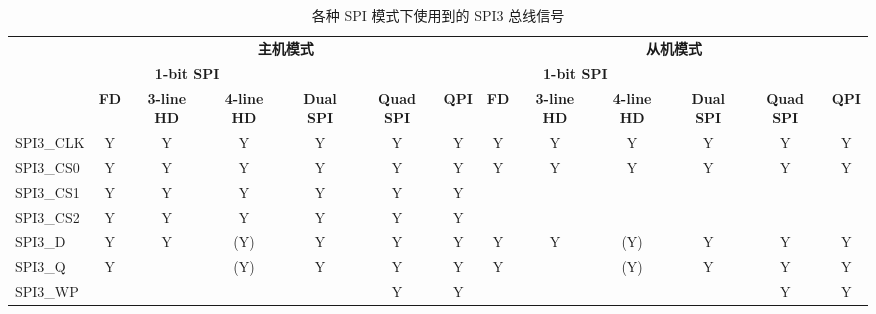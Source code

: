 \documentclass[main\_\_CN.tex]{subfiles}
\begin{document}
\begin{landscape}
\begin{table}[H]
    \centering
    \caption{各种 SPI 模式下使用到的 SPI3 总线信号}
    \label{tab:spi3-bus-singals-used-in-various-spi-modes}

    \begin{threeparttable}
    \begin{tabular}{ |p{2.0cm} |c|c|c|c|c|c|c|c|c|c|c|c| }
    \hline
        \rowcolor{lightgray}
        & \multicolumn{6}{c|}{\textbf{主机模式}} & \multicolumn{6}{c|}{\textbf{从机模式}} \\\cline{2-13}
        \rowcolor{lightgray}
        & \multicolumn{3}{c|}{\textbf{1-bit SPI}} & & & & \multicolumn{3}{c|}{\textbf{1-bit SPI}} & & & \\ \cline{2-4} \cline{8-10}
        \rowcolor{lightgray}
        \multirow{-3}{*}{\textbf{SPI3 总线信号}} & \textbf{FD\tnote{1}} & \textbf{3-line HD\tnote{2}} & \textbf{4-line HD} & \multirow{-2}{*}{\textbf{Dual SPI}} & \multirow{-2}{*}{\textbf{Quad SPI}} & \multirow{-2}{*}{\textbf{QPI}} & \textbf{FD} & \textbf{3-line HD} & \textbf{4-line HD} & \multirow{-2}{*}{\textbf{Dual SPI}} & \multirow{-2}{*}{\textbf{Quad SPI}} & \multirow{-2}{*}{\textbf{QPI}} \\ \hline
SPI3\_CLK                  & Y       & Y       & Y       & Y       & Y       & Y      & Y       & Y      & Y       & Y       & Y       & Y      \\ \hline
SPI3\_CS0                  & Y       & Y       & Y       & Y       & Y       & Y      & Y       & Y      & Y       & Y       & Y       & Y      \\ \hline
SPI3\_CS1                  & Y       & Y       & Y       & Y       & Y       & Y      &         &        &         &         &         &        \\ \hline
SPI3\_CS2                  & Y       & Y       & Y       & Y       & Y       & Y      &         &        &         &         &         &        \\ \hline
SPI3\_D                    & Y       & Y       & (Y)\tnote{3}      & Y\tnote{4}      & Y\tnote{5}      & Y      & Y       & Y      & (Y)\tnote{6}      & Y\tnote{7}     & Y\tnote{8}     & Y      \\ \hline
SPI3\_Q                    & Y       &         & (Y)\tnote{3}      & Y\tnote{4}      & Y\tnote{5}      & Y      & Y       &        & (Y)\tnote{6}     & Y\tnote{7}     & Y\tnote{8}      & Y      \\ \hline
SPI3\_WP                   &         &         &         &         & Y\tnote{5}      & Y      &         &        &         &         & Y\tnote{8}       & Y      \\ \hline

\end{tabular}
\end{threeparttable}
\end{table}
\end{landscape}
\end{document}
